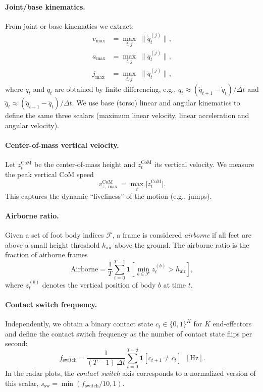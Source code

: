 \paragraph{Joint/base kinematics.}
From joint or base kinematics we extract:
\begin{align}
v_{\max} &= \max_{t,j} \;\bigl\lVert \dot{q}_t^{(j)} \bigr\rVert , \\
a_{\max} &= \max_{t,j} \;\bigl\lVert \ddot{q}_t^{(j)} \bigr\rVert , \\
j_{\max} &= \max_{t,j} \;\bigl\lVert \dddot{q}_t^{(j)} \bigr\rVert ,
\end{align}
where $\ddot{q}_t$ and $\dddot{q}_t$ are obtained by finite differencing,
e.g.,
\(
 \ddot{q}_t \approx (\dot{q}_{t+1} - \dot{q}_{t}) / \Delta t
\)
and
\(
 \dddot{q}_t \approx (\ddot{q}_{t+1} - \ddot{q}_{t}) / \Delta t
\).
We use base (torso) linear and angular kinematics to define the same three scalars (maximum linear velocity, linear acceleration and angular velocity).

\paragraph{Center-of-mass vertical velocity.}
Let $z_t^{\mathrm{CoM}}$ be the center-of-mass height and $\dot{z}_t^{\mathrm{CoM}}$ its vertical velocity.
We measure the peak vertical CoM speed
\begin{equation}
 v^{\mathrm{CoM}}_{z,\max} = \max_t \bigl\lvert \dot{z}_t^{\mathrm{CoM}} \bigr\rvert .
\end{equation}
This captures the dynamic “liveliness'' of the motion (e.g., jumps).

\paragraph{Airborne ratio.}
Given a set of foot body indices $\mathcal{F}$, a frame is considered \emph{airborne} if all feet
are above a small height threshold $h_{\text{air}}$ above the ground. The airborne ratio is
the fraction of airborne frames
\begin{equation}
 \mathrm{Airborne} = \frac{1}{T} \sum_{t=0}^{T-1}
   \mathbf{1}\!\left[
     \min_{b \in \mathcal{F}} z_t^{(b)} > h_{\text{air}}
   \right],
\end{equation}
where $z_t^{(b)}$ denotes the vertical position of body $b$ at time $t$.

\paragraph{Contact switch frequency.}
Independently, we obtain a binary contact state $c_t \in \{0,1\}^K$ for $K$ end-effectors
and define the contact switch frequency as the number of contact state flips per second:
\begin{equation}
 f_{\text{switch}} =
  \frac{1}{(T-1)\,\Delta t}
  \sum_{t=0}^{T-2} \mathbf{1}[c_{t+1} \neq c_t] \;\;[\text{Hz}].
\end{equation}
In the radar plots, the \emph{contact switch} axis corresponds to a normalized version of this
scalar, $s_{\text{sw}} = \min(f_{\text{switch}}/10, 1)$.

